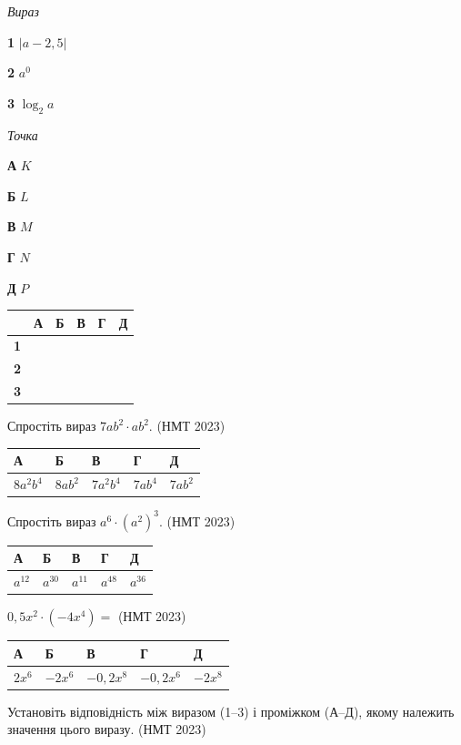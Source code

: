 \documentclass[14pt]{extarticle}
\newcommand{\answerTable}[5]{
\begin{center}
\begin{tabular}{|*{5}{>{\centering\arraybackslash}m{2.8cm}|}}
\hline
\rule[-0.3cm]{0pt}{0.8cm}\textbf{А} & \textbf{Б} & \textbf{В} & \textbf{Г} & \textbf{Д} \\
\hline
\rule[-0.4cm]{0pt}{1.0cm}#1 & \rule[-0.4cm]{0pt}{1.0cm}#2 & \rule[-0.4cm]{0pt}{1.0cm}#3 & \rule[-0.4cm]{0pt}{1.0cm}#4 & \rule[-0.4cm]{0pt}{1.0cm}#5 \\
\hline
\end{tabular}
\end{center}
}
\newcommand{\matchTable}{
\begin{tabular}{|>{\centering\arraybackslash}p{0.2cm}|*{5}{>{\centering\arraybackslash}p{0.2cm}|}}
\hline
& \textbf{А} & \textbf{Б} & \textbf{В} & \textbf{Г} & \textbf{Д} \\
\hline
\textbf{1} & \rule{0pt}{0.2cm} & & & & \\
\hline
\textbf{2} & \rule{0pt}{0.2cm} & & & & \\
\hline
\textbf{3} & \rule{0pt}{0.2cm} & & & & \\
\hline
\end{tabular}
}
\newcommand{\task}[2]{\noindent\makebox[1.5em][l]{\textbf{#1.}}\parbox[t]{\dimexpr\textwidth-1.5em}{#2}}
\newcommand{\nmtyear}[1]{\hfill{\small\color{yearcolor}(НМТ #1)}}
\begin{document}
\vspace{0.3cm}
\begin{minipage}{0.35\textwidth}
\textit{Вираз}

\vspace{0.2cm}
\textbf{1} \quad $|a - 2{,}5|$

\vspace{0.2cm}
\textbf{2} \quad $a^0$

\vspace{0.2cm}
\textbf{3} \quad $\log_2 a$
\end{minipage}
\hfill
\begin{minipage}{0.35\textwidth}
\textit{Точка}

\vspace{0.2cm}
\textbf{А} \quad $K$

\vspace{0.2cm}
\textbf{Б} \quad $L$

\vspace{0.2cm}
\textbf{В} \quad $M$

\vspace{0.2cm}
\textbf{Г} \quad $N$

\vspace{0.2cm}
\textbf{Д} \quad $P$
\end{minipage}
\hfill
\begin{minipage}{0.2\textwidth}
\matchTable
\end{minipage}

\vspace{0.7cm}

\task{6}{Спростіть вираз $7ab^2 \cdot ab^2$. \nmtyear{2023}}
\answerTable{$8a^2b^4$}{$8ab^2$}{$7a^2b^4$}{$7ab^4$}{$7ab^2$}

\vspace{0.5cm}

\task{7}{Спростіть вираз $a^6 \cdot (a^2)^3$. \nmtyear{2023}}
\answerTable{$a^{12}$}{$a^{30}$}{$a^{11}$}{$a^{48}$}{$a^{36}$}

\vspace{0.5cm}

\task{8}{$0{,}5x^2 \cdot (-4x^4) =$ \nmtyear{2023}}
\answerTable{$2x^6$}{$-2x^6$}{$-0{,}2x^8$}{$-0{,}2x^6$}{$-2x^8$}

\vspace{0.5cm}

\task{9}{Установіть відповідність між виразом (1--3) і проміжком (А--Д), якому належить значення цього виразу. \nmtyear{2023}}
\end{document}
